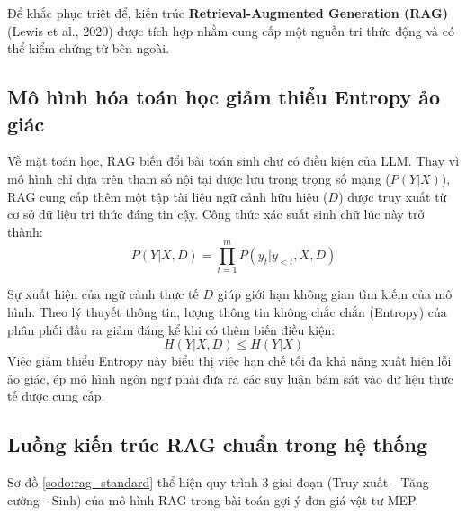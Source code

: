 Để khắc phục triệt để, kiến trúc \textbf{Retrieval-Augmented Generation (RAG)} (Lewis et al., 2020) được tích hợp nhằm cung cấp một nguồn tri thức động và có thể kiểm chứng từ bên ngoài.

\subsection{Mô hình hóa toán học giảm thiểu Entropy ảo giác}

Về mặt toán học, RAG biến đổi bài toán sinh chữ có điều kiện của LLM. Thay vì mô hình chỉ dựa trên tham số nội tại được lưu trong trọng số mạng ($P(Y | X)$), RAG cung cấp thêm một tập tài liệu ngữ cảnh hữu hiệu ($D$) được truy xuất từ cơ sở dữ liệu tri thức đáng tin cậy. Công thức xác suất sinh chữ lúc này trở thành:
\begin{equation}
    P(Y | X, D) = \prod_{t=1}^{m} P(y_t | y_{<t}, X, D)
\end{equation}

Sự xuất hiện của ngữ cảnh thực tế $D$ giúp giới hạn không gian tìm kiếm của mô hình. Theo lý thuyết thông tin, lượng thông tin không chắc chắn (Entropy) của phân phối đầu ra giảm đáng kể khi có thêm biến điều kiện:
\begin{equation}
    H(Y | X, D) \le H(Y | X)
\end{equation}
Việc giảm thiểu Entropy này biểu thị việc hạn chế tối đa khả năng xuất hiện lỗi ảo giác, ép mô hình ngôn ngữ phải đưa ra các suy luận bám sát vào dữ liệu thực tế được cung cấp.

\subsection{Luồng kiến trúc RAG chuẩn trong hệ thống}

Sơ đồ \ref{sodo:rag_standard} thể hiện quy trình 3 giai đoạn (Truy xuất - Tăng cường - Sinh) của mô hình RAG trong bài toán gợi ý đơn giá vật tư MEP.

